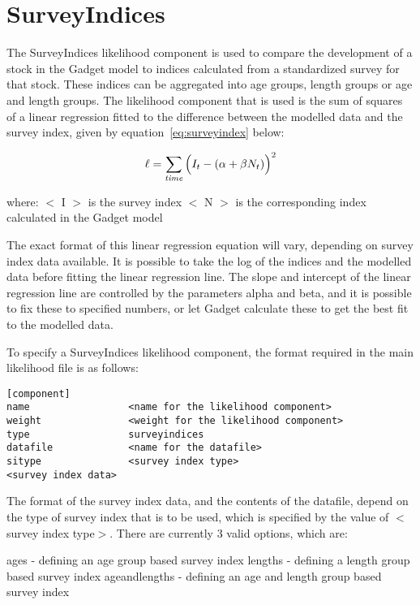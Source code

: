 \documentclass [a4paper, 10pt]{book}
\begin{document}
\section{SurveyIndices}\label{sec:surveyindices}
The SurveyIndices likelihood component is used to compare the development of a stock in the Gadget model to indices calculated from a standardized survey for that stock.  These indices can be aggregated into age groups, length groups or age and length groups.  The likelihood component that is used is the sum of squares of a linear regression fitted to the difference between the modelled data and the survey index, given by  equation~\ref{eq:surveyindex} below:

\begin{equation}\label{eq:surveyindex}
\ell = \sum_{\it time}\Big(I_{t} - (\alpha + \beta N_{t})\Big)^2
\end{equation}

where:\newline
$<$ I $>$ is the survey index\newline
$<$ N $>$ is the corresponding index calculated in the Gadget model

\bigskip
The exact format of this linear regression equation will vary, depending on survey index data available.  It is possible to take the log of the indices and the modelled data before fitting the linear regression line.  The slope and intercept of the linear regression line are controlled by the parameters alpha and beta, and it is possible to fix these to specified numbers, or let Gadget calculate these to get the best fit to the modelled data.

\bigskip
To specify a SurveyIndices likelihood component, the format required in the main likelihood file is as follows:

{\small\begin{verbatim}
[component]
name                 <name for the likelihood component>
weight               <weight for the likelihood component>
type                 surveyindices
datafile             <name for the datafile>
sitype               <survey index type>
<survey index data>
\end{verbatim}}

The format of the survey index data, and the contents of the datafile, depend on the type of survey index that is to be used, which is specified by the value of $<$survey index type$>$.  There are currently 3 valid options, which are:

\bigskip
ages - defining an age group based survey index\newline
lengths - defining a length group based survey index\newline
ageandlengths - defining an age and length group based survey index
\end{document}
